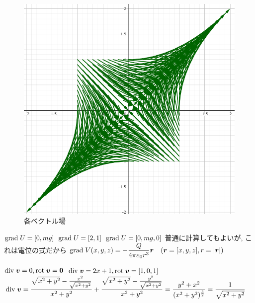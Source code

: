 \documentclass[a4j,dvipdfmx]{jsarticle}
\renewcommand{\div}{{\rm div}\hspace{1mm}}
\newcommand{\grad}{{\rm grad}\hspace{1mm}}
\newcommand{\rot}{{\rm rot}\hspace{1mm}}
\begin{document}
\begin{qparts}
\begin{figure}[h]
\begin{minipage}[t]{.3\textwidth}
                \end{minipage}
                \begin{minipage}[t]{.3\textwidth}
                    \centering
                    \includegraphics[scale=0.25]{img/vector_field3.png}
                \end{minipage}
                \caption{各ベクトル場}
            \end{figure}
            \qpart 
            \begin{qlist}
                \setcounter{enumi}{3}
                \qitem $\grad U = [0,mg]$
                \qitem $\grad U = [2,1]$
                \qitem $\grad U = [0,mg,0]$
                \qitem 普通に計算してもよいが, これは電位の式だから
                $\displaystyle \grad V(x,y,z)=-\frac{Q}{4\pi\varepsilon_0r^3}\bm{r}\quad (\bm{r}=[x,y,z],r=|\bm{r}|)$
            \end{qlist}
            \qpart 
            \begin{qlist}
                \qitem $\div\bm{v}=0,\rot\bm{v}=\bm{0}$
                \qitem $\div\bm{v}=2x+1,\rot\bm{v}=[1,0,1]$
                \qitem $\displaystyle \div\bm{v}=\frac{\sqrt{x^2+y^2}-\frac{x^2}{\sqrt{x^2+y^2}}}{x^2+y^2}+\frac{\sqrt{x^2+y^2}-\frac{y^2}{\sqrt{x^2+y^2}}}{x^2+y^2}=\frac{y^2+x^2}{(x^2+y^2)^{\frac{3}{2}}}=\frac{1}{\sqrt{x^2+y^2}}$\\

\end{qlist}
\end{qparts}
\end{document}
